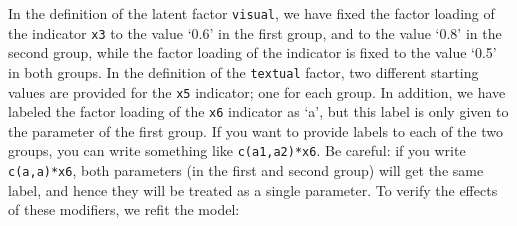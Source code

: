 In the definition of the latent factor \texttt{visual}, we have fixed
the factor loading of the indicator \texttt{x3} to the value `0.6' in
the first group, and to the value `0.8' in the second group, while the
factor loading of the indicator is fixed to the value `0.5' in both
groups. In the definition of the \texttt{textual} factor, two different
starting values are provided for the \texttt{x5} indicator; one for each
group. In addition, we have labeled the factor loading of the
\texttt{x6} indicator as `a', but this label is only given to the
parameter of the first group. If you want to provide labels to each of
the two groups, you can write something like \texttt{c(a1,a2)*x6}. Be
careful: if you write \texttt{c(a,a)*x6}, both parameters (in the first
and second group) will get the same label, and hence they will be
treated as a single parameter. To verify the effects of these modifiers,
we refit the model:

\begin{Shaded}
\begin{Highlighting}[]
\StringTok{ }
            
            \NormalTok{)}
\end{Highlighting}
\end{Shaded}

